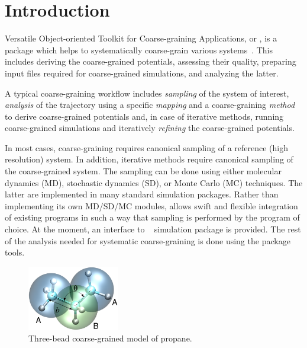 \chapter{Introduction}
\label{sec:introduction}

Versatile Object-oriented Toolkit for Coarse-graining Applications, or \votca, is a package which helps to systematically coarse-grain various systems~\cite{Ruehle:2009.a}. This includes  deriving the coarse-grained potentials, assessing their quality, preparing input files required for coarse-grained simulations, and analyzing the latter.

A typical coarse-graining workflow includes {\em sampling} of the system of interest, {\em analysis} of the trajectory using a specific {\em mapping} and a coarse-graining {\em method} to derive coarse-grained potentials and, in case of iterative methods, running coarse-grained simulations and iteratively {\em refining} the coarse-grained potentials.

In most cases, coarse-graining requires canonical sampling of a reference (high resolution) system. In addition, iterative methods require canonical sampling of the coarse-grained system. The sampling can be done using either molecular dynamics (MD), stochastic dynamics (SD), or Monte Carlo (MC) techniques. The latter are implemented in many standard simulation packages. Rather than implementing its own MD/SD/MC modules, \votca allows swift and flexible integration of existing  programs in such a way that sampling is performed by the program of choice. At the moment, an interface to \gromacs~\cite{gromacs4} simulation package is provided. The rest of the analysis needed for systematic coarse-graining is done using the package tools.

\begin{figure}
 \includegraphics[width=4cm]{fig/propane}
 \caption{\small Three-bead coarse-grained model of propane.
 \label{fig:intro:propane}
}
\end{figure}

